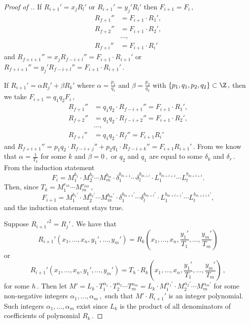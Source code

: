 \documentclass{toc}
\begin{document}
\begin{proof}[Proof of .]
 If $R_{i + 1}' = x_j R_l'$ or $R_{i + 1}' = y_j' R_l'$ then %
$F_{i + 1} = F_i\,,$ %
\begin{align*}
R_{f + 1}'' &= F_{i + 1} \cdot R_1', \\ R_{f + 2}'' &= F_{i + 1} \cdot R_2', \\ &\ldots, \\  R_{f + i}'' &= F_{i + 1} \cdot R_i'
\end{align*}
%
and $R_{f + i + 1}'' = x_j R_{f - i + l}'' = F_{i + 1} \cdot R_{i + 1}'$ or %
$R_{f + i + 1}'' = y_j' R_{f - i + l}'' = F_{i + 1} \cdot R_{i + 1}'\,.$ %
%

%
 If $R_{i + 1}' = \alpha R_j' + \beta R_k'$ where $\alpha = \frac{p_1}{q_1}$ and $\beta = \frac{p_2}{q_2}$ with %
$\{p_1, q_1, p_2, q_2\} \subset \Z\,,$ %
 then we take %
$F_{i + 1} = q_1 q_2 F_i\,,$ %
%
\begin{align*}
R_{f + 1}'' &= q_1 q_2 \cdot R_{f - i + 1}'' = F_{i + 1} \cdot R_1', \\ R_{f + 2}'' &= q_1 q_2 \cdot R_{f - i + 2}'' = F_{i + 1} \cdot R_2', \\ &\ldots, \\ R_{f + i}'' &= q_1 q_2 \cdot R_{f}'' = F_{i + 1} R_{i}'  
\end{align*}
%
and %
$R_{f + i + 1}'' = p_1 q_2 \cdot R_{f - i + j}'' + p_2 q_1 \cdot R_{f - i + k}'' = F_{i + 1} R_{i + 1}'\,.$ %
 From  we know that $\alpha = \frac{1}{T_k}$ for some $k$ and %
$\beta = 0\,,$ %
 or $q_2$ and $q_1$ are equal to some $\delta_k$ and %
$\delta_r\,.$ %
 From the induction statement %
$$
F_i = M_1^{b_1} \cdot M_2^{b_2} \cdots M_m^{b_m} \cdot \delta_1^{b_{m + 1}} \cdots \delta_l^{b_{m + l}} \cdot  L_1^{b_{m + l + 1}} \cdots L_t^{b_{m + l + t}}.
$$
Then, since %
$T_k = M_1^{r_{1 k}} \cdots M_m^{r_{m k}}\,,$ %
$$
F_{i + 1} = M_1^{b_1'} \cdot M_2^{b_2'} \cdots M_m^{b_m'} \cdot \delta_1^{b_{m + 1}'} \cdots \delta_l^{b_{m + l}'} \cdot  L_1^{b_{m + l + 1}'} \cdots L_t^{b_{m + l + t}'},
$$
and the induction statement stays true.

 Suppose %
$R_{i + 1}'^2 = R_j'\,.$ %
 We have that
$$
R_{i  +1}'(x_1, \ldots, x_n, y_1', \ldots,y_m') = R_{k}(x_1, \ldots, x_n, \frac{y_1'}{T_1}, \ldots, \frac{y_m'}{T_m})
$$ or $$
%
R_{i  +1}'(x_1, \ldots, x_n, y_1', \ldots,y_m') = T_h \cdot R_{k}(x_1, \ldots, x_n, \frac{y_1'}{T_1}, \ldots, \frac{y_m'}{T_m})\,, %
$$
for some %
$h\,.$ %
 Then let $M' = L_k \cdot T_1^{\alpha_1} \cdot T_2^{\alpha_2} \cdots T_m^{\alpha_m} = L_k \cdot M_1^{\alpha_1'} \cdot M_2^{\alpha_2'} \cdots M_m^{\alpha_m'}$ for some non-negative integers %
$\alpha_1, \ldots, \alpha_m\,,$ %
 such that $M' \cdot R_{i + 1}'$ is an integer polynomial. Such integers $\alpha_1, \ldots, \alpha_m$ exist since $L_k$ is the product of all denominators of coefficients of polynomial %
$R_k\,.$ %



\end{proof}
\end{document}
